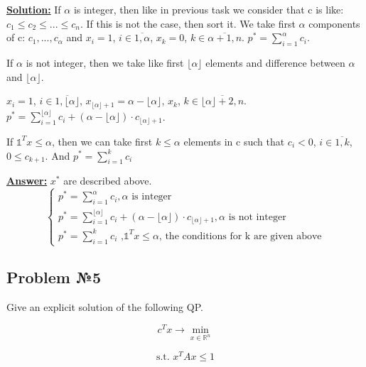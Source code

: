 \underline{\textbf{Solution:}}
If $\alpha$ is integer, then like in previous task we consider that c is like: $c_1 \leq c_2 \leq ... \leq c_n$. If this is not the case, then sort it.
We take first $\alpha$ components of c: $c_1, ..., c_{\alpha}$ and $x_i = 1$, $i \in \overline{1, \alpha}$, $x_k = 0$, $k \in \overline{\alpha + 1, n}$. $p^* = \sum\limits_{i=1}^\alpha c_i$.

If $\alpha$ is not integer, then we take like first $\lfloor \alpha \rfloor$ elements and difference between $\alpha$ and $\lfloor \alpha \rfloor$. 

$x_i = 1$, $i \in \overline{1, \lfloor \alpha \rfloor}$, $x_{\lfloor \alpha \rfloor + 1} = \alpha - \lfloor \alpha \rfloor$, $x_{k}$, $k \in \overline{\lfloor \alpha \rfloor + 2, n}$. $p^* = \sum\limits_{i=1}^{\lfloor \alpha \rfloor}c_i + (\alpha - \lfloor \alpha \rfloor) \cdot c_{\lfloor \alpha \rfloor + 1}$.

If $\mathds{1}^Tx \leq \alpha$, then we can take first $k \leq \alpha$ elements in c such that $c_i < 0$, $i \in \overline{1, k}$, $0 \leq c_{k+1}$. And $p^* = \sum\limits_{i=1}^kc_i$

\underline{\textbf{Answer:}} $x^*$ are described above.
\begin{equation*}
    \begin{cases}
    p^* = \sum\limits_{i=1}^\alpha c_i, \alpha \text{ is integer} \\
    p^* = \sum\limits_{i=1}^{\lfloor \alpha \rfloor}c_i + (\alpha - \lfloor \alpha \rfloor) \cdot c_{\lfloor \alpha \rfloor + 1}, \alpha \text{ is not integer}  \\
    p^* = \sum\limits_{i=1}^kc_i \text{ ,} \mathds{1}^T x \leq \alpha \text{, the conditions for k are given above}
    \end{cases}
\end{equation*}

\subsection{Problem №5}
Give an explicit solution of the following QP.

\begin{equation*}
    c^T x  \xrightarrow{} \min\limits_{x \in \mathds{R}^n}
\end{equation*}

\begin{equation*}
   \text{s.t. } x^TAx \leq 1
\end{equation*}

